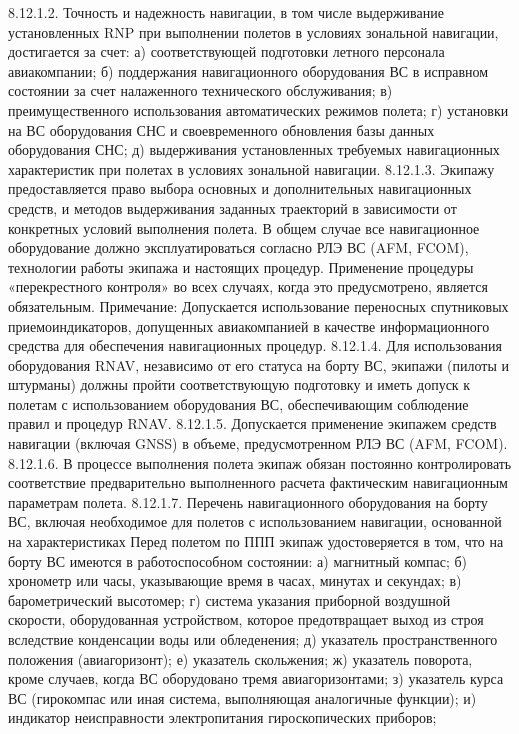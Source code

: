 8.12.1.2. Точность и надежность навигации, в том числе выдерживание установленных RNP при выполнении полетов в условиях зональной навигации, достигается за счет:
а)	соответствующей подготовки летного персонала авиакомпании;
б)	поддержания навигационного оборудования ВС в исправном состоянии за счет налаженного технического обслуживания;
в)	преимущественного использования автоматических режимов полета;
г)	установки на ВС оборудования СНС и своевременного обновления базы данных оборудования СНС;
д)	выдерживания установленных требуемых навигационных характеристик при полетах в условиях зональной навигации.
8.12.1.3. Экипажу предоставляется право выбора основных и дополнительных навигационных средств, и методов выдерживания заданных траекторий в зависимости от конкретных условий выполнения полета. В общем случае все навигационное оборудование должно эксплуатироваться согласно РЛЭ ВС (AFM, FCOM), технологии работы экипажа и настоящих процедур. Применение процедуры «перекрестного контроля» во всех случаях, когда это предусмотрено, является обязательным. 
Примечание: Допускается использование переносных спутниковых приемоиндикаторов, допущенных авиакомпанией в качестве информационного средства для обеспечения навигационных процедур. 
8.12.1.4. Для использования оборудования RNAV, независимо от его статуса на борту ВС, экипажи (пилоты и штурманы) должны пройти соответствующую подготовку и иметь допуск к полетам с использованием оборудования ВС, обеспечивающим соблюдение правил и процедур RNAV. 
8.12.1.5. Допускается применение экипажем средств навигации (включая GNSS) в объеме, предусмотренном РЛЭ ВС (AFM, FCOM).
8.12.1.6. В процессе выполнения полета экипаж обязан постоянно контролировать соответствие предварительно выполненного расчета фактическим навигационным параметрам полета.
8.12.1.7.	Перечень навигационного оборудования на борту ВС, включая необходимое для полетов с использованием навигации, основанной на характеристиках
Перед полетом по ППП экипаж удостоверяется в том, что на борту ВС имеются в работоспособном состоянии:
а)	магнитный компас;
б)	хронометр или часы, указывающие время в часах, минутах и секундах;
в)	барометрический высотомер;
г)	система указания приборной воздушной скорости, оборудованная устройством, которое предотвращает выход из строя вследствие конденсации воды или обледенения;
д)	указатель пространственного положения (авиагоризонт);
е)	указатель скольжения;
ж)	указатель поворота, кроме случаев, когда ВС оборудовано тремя авиагоризонтами;
з)	указатель курса ВС (гирокомпас или иная система, выполняющая аналогичные функции);
и)	индикатор неисправности электропитания гироскопических приборов;
